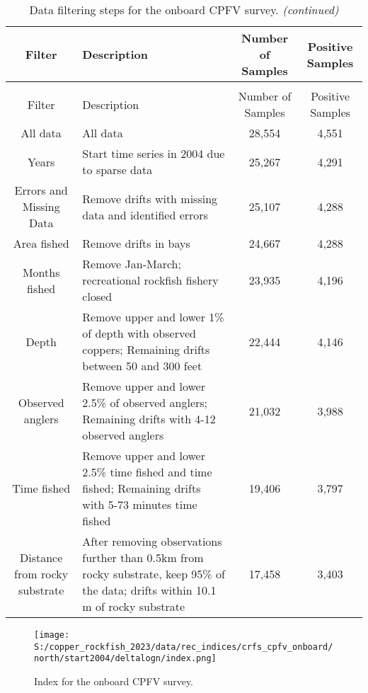 \documentclass[11pt,
  english,
  letterpaper,
]{article}
\begin{document}
\begin{longtable}[t]{c>{\centering\arraybackslash}p{8cm}cc}
\caption{\label{tab:onboard-filter}Data filtering steps for the onboard CPFV survey.}\\
\toprule
Filter & Description & Number of Samples & Positive Samples\\
\midrule
\endfirsthead
\caption[]{\label{tab:onboard-filter}Data filtering steps for the onboard CPFV survey. \textit{(continued)}}\\
\toprule
Filter & Description & Number of Samples & Positive Samples\\
\midrule
\endhead

\endfoot
\bottomrule
\endlastfoot
All data & All data & 28,554 & 4,551\\
Years & Start time series in 2004 due to sparse data & 25,267 & 4,291\\
Errors and Missing Data & Remove drifts with missing data and identified errors & 25,107 & 4,288\\
Area fished & Remove drifts in bays & 24,667 & 4,288\\
Months fished & Remove Jan-March; recreational rockfish fishery closed & 23,935 & 4,196\\
Depth & Remove upper and lower 1\% of depth with observed coppers;
                                           Remaining drifts between 50 and 300 feet & 22,444 & 4,146\\
Observed anglers & Remove upper and lower 2.5\% of observed anglers;
                                           Remaining drifts with 4-12 observed anglers & 21,032 & 3,988\\
Time fished & Remove upper and lower 2.5\% time fished and
                                         time fished; Remaining drifts with 5-73 minutes time fished & 19,406 & 3,797\\
Distance from rocky substrate & After removing observations further
than 0.5km from rocky substrate, keep 95\% of the data; drifts within 10.1 m of rocky substrate & 17,458 & 3,403\\*
\end{longtable}
\endgroup{}
\endgroup{}

\newpage

\begin{figure}
\centering
\texttt{[image: S:/copper\_rockfish\_2023/data/rec\_indices/crfs\_cpfv\_onboard/north/start2004/deltalogn/index.png]}
\caption{Index for the onboard CPFV survey.\label{fig:onboard-index}}
\end{figure}
\end{document}
